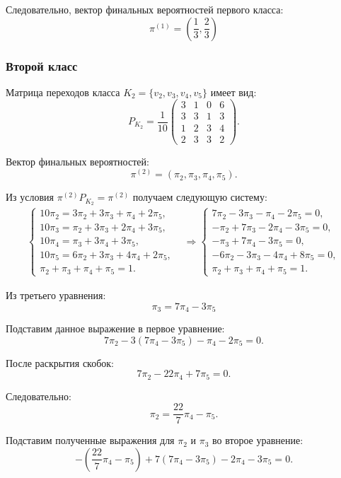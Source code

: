 \documentclass[a4paper, final]{article}
\begin{document}
	Следовательно, вектор финальных вероятностей
	первого класса:
	\[
	{
		\pi^{(1)}=\left(\frac13,\frac23\right)
	}
	\]
	
	\subsubsection*{Второй класс}
	
	Матрица переходов класса $ K_2=\{v_2,v_3,v_4,v_5\}$ имеет вид:
	\[
	P_{K_2}=\frac1{10}
	\begin{pmatrix}
		3&1&0&6\\
		3&3&1&3\\
		1&2&3&4\\
		2&3&3&2
	\end{pmatrix}.
	\]
	
	Вектор финальных вероятностей:
	\[
	\pi^{(2)}=(\pi_2,\pi_3,\pi_4,\pi_5).
	\]
	
	Из условия $\pi^{(2)}P_{K_2}=\pi^{(2)}$
	получаем следующую систему:
	\[
	\begin{aligned}
	\begin{cases}
		10\pi_2=3\pi_2+3\pi_3+\pi_4+2\pi_5,\\
		10\pi_3=\pi_2+3\pi_3+2\pi_4+3\pi_5,\\
		10\pi_4=\pi_3+3\pi_4+3\pi_5,\\
		10\pi_5=6\pi_2+3\pi_3+4\pi_4+2\pi_5,\\
		\pi_2+\pi_3+\pi_4+\pi_5=1.
	\end{cases}
	&\Rightarrow
		\begin{cases}
		7\pi_2-3\pi_3-\pi_4-2\pi_5=0,\\
		-\pi_2+7\pi_3-2\pi_4-3\pi_5=0,\\
		-\pi_3+7\pi_4-3\pi_5=0,\\
		-6\pi_2-3\pi_3-4\pi_4+8\pi_5=0,\\
		\pi_2+\pi_3+\pi_4+\pi_5=1.
	\end{cases}
	\end{aligned}
	\]
	
	Из третьего уравнения:
	\[
	{\pi_3=7\pi_4-3\pi_5}
	\]
	
	Подставим данное выражение в первое уравнение:
	\[
	7\pi_2-3(7\pi_4-3\pi_5)-\pi_4-2\pi_5=0.
	\]
	
	После раскрытия скобок:
	\[
	7\pi_2-22\pi_4+7\pi_5=0.
	\]
	
	Следовательно:
	\[
	{
		\pi_2=\frac{22}{7}\pi_4-\pi_5
	}.
	\]
	
	Подставим полученные выражения для $\pi_2$
	и $\pi_3$ во второе уравнение:
	\[
	-\left(\frac{22}{7}\pi_4-\pi_5\right)
	+7(7\pi_4-3\pi_5)
	-2\pi_4-3\pi_5=0.
	\]
	
\end{document}
